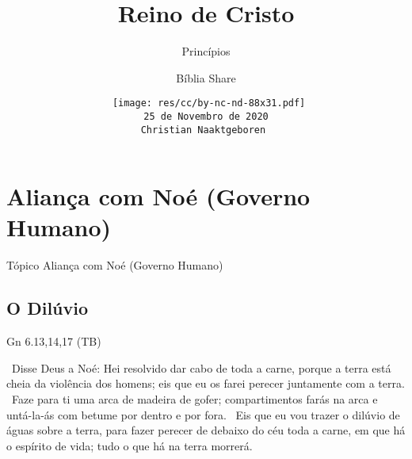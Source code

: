 \documentclass[12pt,aspectratio=169]{beamer}
\title[Reino de Cristo -- Princípios]{Reino de Cristo}
\subtitle{Princípios}
\author{Bíblia Share}
\date[{\tiny\tt 25 de Novembro de 2020}]{{\scriptsize\tt%
    \texttt{[image: res/cc/by-nc-nd-88x31.pdf]}\\[\smallskipamount]
    25 de Novembro de 2020\\
    Christian Naaktgeboren
}}
\newcommand{\ver}[1]{%
    \raisebox{0.50ex}{%
        \scalebox{1.1}{%
            \pmb{\textbf{\textcolor{BSpbg}{#1}}}%
        }%
    }%
}
\newcommand{\QUOTE}[1]{%
    \par\noindent\hspace*{0.05\linewidth}%
    \begin{minipage}{0.9\linewidth}%
        \linespread{1.35}\large{#1}%
    \end{minipage}%
}
\newcommand{\RED}[1]{{\textcolor{TXred}{#1}}}
\newcommand{\YEL}[1]{{\textcolor{TXyel}{#1}}}
\newcommand{\GRE}[1]{{\textcolor{TXgre}{#1}}}
\begin{document}
\begin{frame}
    \titlepage
\end{frame}
\section{Aliança com Noé (Governo Humano)}

    \begin{frame}
        \par\noindent\hspace*{0.05\linewidth}%
        \begin{minipage}{0.9\linewidth}%
            \large%
            \begin{alertblock}{Tópico}
                Aliança com Noé (Governo Humano)
            \end{alertblock}
        \end{minipage}%
    \end{frame}

    \subsection{O Dilúvio}

    \begin{frame}{Gn 6.13,14,17 (TB)}
        \QUOTE{%
            \ver{13}~Disse Deus a Noé: Hei resolvido dar cabo de toda a carne, porque a terra
            está cheia da \RED{violência dos homens}; eis que eu os farei perecer juntamente com
            a terra.
            \ver{14}~Faze para ti uma \GRE{arca} de madeira de gofer; compartimentos farás na
            arca e untá-la-ás com betume por dentro e por fora.
            \ver{17}~Eis que eu vou trazer o \YEL{dilúvio} de águas sobre a terra, para fazer
            perecer de debaixo do céu toda a carne, em que há o espírito de vida; \RED{tudo} o
            que há na terra \RED{morrerá}.
        }
    \end{frame}
\end{document}
